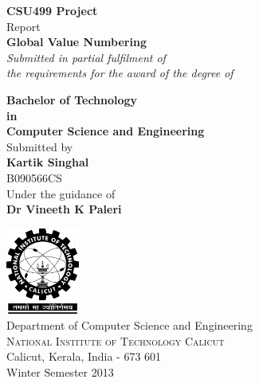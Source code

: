 \begin{titlepage}

\begin{center}

\textup{\small {\bf CSU499 Project} \\ Report}\\[0.4in]

\Large \textbf {Global Value Numbering}\\[0.5in]

       \small \emph{Submitted in partial fulfilment of\\
        the requirements for the award of the degree of}
        \vspace{.2in}

       {\bf Bachelor of Technology \\in\\ Computer Science and Engineering}\\[0.5in]

\normalsize Submitted by \\[0.2in]
\textbf {Kartik Singhal} \\ 
B090566CS\\

\vspace{.3in}
Under the guidance of\\
{\textbf{Dr Vineeth K Paleri}}\\
\vfill


\includegraphics[width=0.18\textwidth]{./nitc-logo}\\[0.2in]
\Large{Department of Computer Science and Engineering}\\
\normalsize
\textsc{National Institute of Technology Calicut}\\
Calicut, Kerala, India - 673 601 \\
\vspace{0.5cm}
Winter Semester 2013

\end{center}

\end{titlepage}
